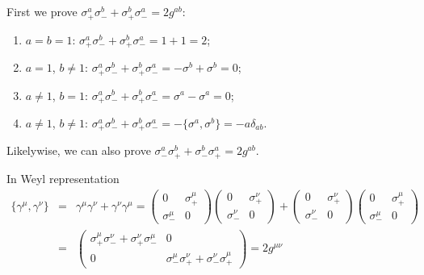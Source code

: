 \documentclass[11pt]{article}
\begin{document}
\section{ }
First we prove $\sigma_+^a \sigma_-^b + \sigma_+^b \sigma_-^a = 2 g^{ab}$:
\begin{enumerate}
    \item $a=b=1$: $\sigma_+^a \sigma_-^b + \sigma_+^b \sigma_-^a = 1+1=2$;
    \item $a=1$, $b\neq 1$: $\sigma_+^a \sigma_-^b + \sigma_+^b \sigma_-^a = -\sigma^b+\sigma^b=0$;
    \item $a\neq 1$, $b=1$: $\sigma_+^a \sigma_-^b + \sigma_+^b \sigma_-^a = \sigma^a-\sigma^a=0$;
    \item $a\neq 1$, $b\neq 1$: $\sigma_+^a \sigma_-^b + \sigma_+^b \sigma_-^a = -\{ \sigma^a,\sigma^b\}=-a\delta_{ab}$.
\end{enumerate}
Likelywise, we can also prove $\sigma_-^a \sigma_+^b + \sigma_-^b \sigma_+^a = 2 g^{ab}$.

In Weyl representation
\begin{eqnarray}
    \{\gamma^\mu,\gamma^\nu\}&=&\gamma^\mu\gamma^\nu+\gamma^\nu\gamma^\mu =
    \begin{pmatrix}
        0 & \sigma_+^\mu \\
        \sigma_-^\mu & 0
    \end{pmatrix}
    \begin{pmatrix}
        0 & \sigma_+^\nu \\
        \sigma_-^\nu & 0
    \end{pmatrix}
    +
    \begin{pmatrix}
        0 & \sigma_+^\nu \\
        \sigma_-^\nu & 0
    \end{pmatrix}
    \begin{pmatrix}
        0 & \sigma_+^\mu \\
        \sigma_-^\mu & 0
    \end{pmatrix}\\
    &=&
    \begin{pmatrix}
         \sigma_+^\mu\sigma_-^\nu+ \sigma_+^\nu\sigma_-^\mu  & 0\\
        0& \sigma_-^\mu\sigma_+^\nu+ \sigma_-^\nu\sigma_+^\mu
    \end{pmatrix}
    =2g^{\mu\nu}
\end{eqnarray}
\end{document}
